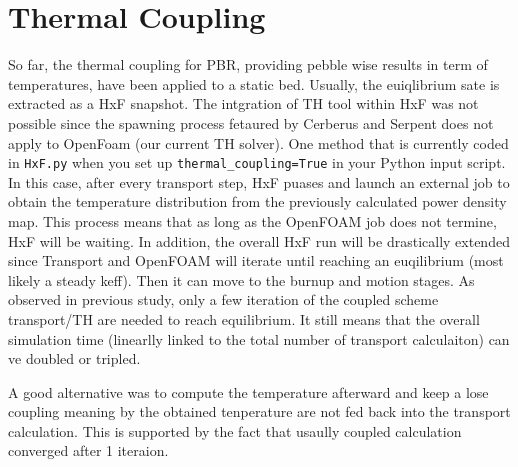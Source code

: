 \documentclass{article}
\begin{document}
\section{Thermal Coupling}\label{sec:TH}
So far, the thermal coupling for PBR, providing pebble wise results in term of temperatures, have been applied to a static bed. Usually, the euiqlibrium sate is extracted as a HxF snapshot. The intgration of TH tool within HxF was not possible since the spawning process fetaured by Cerberus and Serpent does not apply to OpenFoam (our current TH solver). One method that is currently coded in \texttt{HxF.py} when you set up \texttt{thermal\_coupling=True} in your Python input script. In this case, after every transport step, HxF puases and launch an external job to obtain the temperature distribution from the previously calculated power density map. This process means that as long as the OpenFOAM job does not termine, HxF will be waiting. In addition, the overall HxF run will be drastically extended since Transport and OpenFOAM will iterate until reaching an euqilibrium (most likely a steady keff). Then it can move to the burnup and motion stages. As observed in previous study, only a few iteration of the coupled scheme transport/TH are needed to reach equilibrium. It still means that the overall simulation time (linearlly linked to the total number of transport calculaiton) can ve doubled or tripled. 

A good alternative was to compute the temperature afterward and keep a lose coupling meaning by the obtained tenperature are not fed back into the transport calculation. This is supported by the fact that usaully coupled calculation converged after 1 iteraion. 

\newpage
\end{document}
